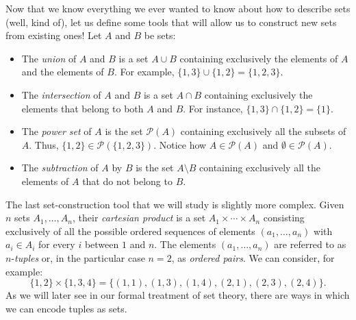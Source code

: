 \begin{para}
Now that we know everything we ever wanted to know about how to describe sets (well, kind of), let us define some tools that will allow us to construct new sets from existing ones! Let $A$ and $B$ be sets:

\begin{itemize}
\item The \emph{union} of $A$ and $B$ is a set $A\cup B$ containing exclusively the elements of $A$ and the elements of $B$. 
For example, $\{1,3\} \cup \{1,2\} = \{1,2,3\}$.
\item The \emph{intersection} of $A$ and $B$ is a set $A\cap B$ containing exclusively the elements that belong to both $A$ and $B$.
For instance, $\{1,3\} \cap \{1,2\} = \{1\}$.
\item The \emph{power set} of $A$ is the set $\mathcal{P}(A)$ containing exclusively all the subsets of $A$. Thus, $\{1,2\}\in\mathcal{P}(\{1,2,3\})$. Notice how $A \in \mathcal{P}(A)$ and $\emptyset \in \mathcal{P}(A)$.
\item The \emph{subtraction} of $A$ by $B$ is the set $A\setminus B$ containing exclusively all the elements of $A$ that do not belong to $B$.
\end{itemize}

The last set-construction tool that we will study is slightly more complex. Given $n$ sets $A_1,\ldots,A_n$, their \emph{cartesian product} is a set $A_1\times\cdots\times A_n$ consisting exclusively of all the possible ordered sequences of elements $(a_1,\ldots,a_n)$ with $a_i \in A_i$ for every $i$ between $1$ and $n$. The elements $(a_1,\ldots,a_n)$ are referred to as $n$-\emph{tuples} or, in the particular case $n=2$, as \emph{ordered pairs}. 
We can consider, for example:
\[ \{1,2\} \times \{1,3,4\} = \{(1,1),(1,3),(1,4),(2,1),(2,3),(2,4)\}.\]
As we will later see in our formal treatment of set theory, there are ways in which we can encode tuples as sets.
\end{para}

